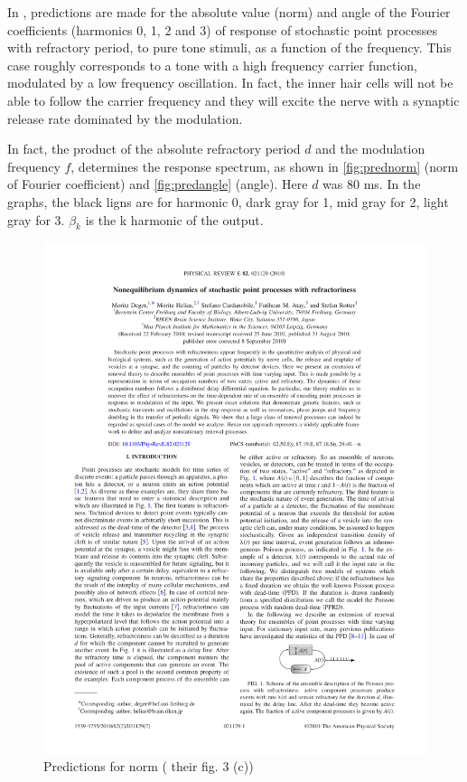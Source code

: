 In \cite{Deger}, predictions are made for the absolute value (norm) and angle of the Fourier coefficients 
(harmonics 0, 1, 2 and 3) of response of stochastic point processes with refractory period,
to pure tone stimuli, as a function of the frequency. 
This case roughly corresponds to a tone with a high frequency carrier function, 
modulated by a low frequency oscillation. 
In fact, the inner hair cells will not be able to follow the carrier frequency 
and they will excite the nerve with a synaptic release rate dominated by the modulation.

In fact, the product of the absolute refractory period $d$ and the modulation frequency $f$,
determines the response spectrum, as shown in \autoref{fig:prednorm} (norm of Fourier coefficient) and 
\autoref{fig:predangle} (angle). Here $d$ was 80 ms. 
In the graphs, the black ligns are for harmonic 0, dark gray for 1, mid gray for 2, light gray for 3.
$\beta_k$ is the k harmonic of the output. 



\begin{figure}[h]
	\centering
	\includegraphics*[page=4,viewport=308 567 441 617]{images/Deger2010.pdf} %
	\caption{Predictions for norm (\cite{Deger}  their fig. 3 (c))}
	\label{fig:prednorm}
\end{figure}

